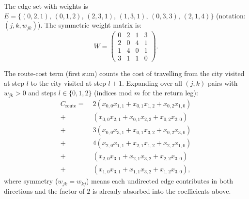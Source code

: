 \documentclass{ceri/sty/rapport}
\begin{document}
\begin{solution}
The edge set with weights is
$E = \{(0,2,1),\,(0,1,2),\,(2,3,1),\,(1,3,1),\,(0,3,3),\,(2,1,4)\}$
(notation: $(j,k,w_{jk})$). The symmetric weight matrix is:
\[
  W = \begin{pmatrix}
    0 & 2 & 1 & 3 \\
    2 & 0 & 4 & 1 \\
    1 & 4 & 0 & 1 \\
    3 & 1 & 1 & 0
  \end{pmatrix}.
\]

The route-cost term (first sum) counts the cost of travelling from the city visited at step $l$
to the city visited at step $l+1$.
Expanding over all $(j,k)$ pairs with $w_{jk}>0$ and steps $l\in\{0,1,2\}$
(indices mod $m$ for the return leg):
\begin{align*}
  C_{\text{route}} = \;&
    2(x_{0,0}x_{1,1} + x_{0,1}x_{1,2} + x_{0,2}x_{1,0}) \\
  +\;& (x_{0,0}x_{2,1} + x_{0,1}x_{2,2} + x_{0,2}x_{2,0}) \\
  +\;& 3(x_{0,0}x_{3,1} + x_{0,1}x_{3,2} + x_{0,2}x_{3,0}) \\
  +\;& 4(x_{2,0}x_{1,1} + x_{2,1}x_{1,2} + x_{2,2}x_{1,0}) \\
  +\;& (x_{2,0}x_{3,1} + x_{2,1}x_{3,2} + x_{2,2}x_{3,0}) \\
  +\;& (x_{1,0}x_{3,1} + x_{1,1}x_{3,2} + x_{1,2}x_{3,0}),
\end{align*}
where symmetry ($w_{jk}=w_{kj}$) means each undirected edge contributes in both directions
and the factor of $2$ is already absorbed into the coefficients above.
\end{solution}


\end{document}
